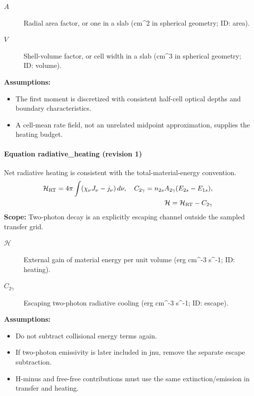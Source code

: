 \begin{description}
\item[$A$] Radial area factor, or one in a slab (cm\textasciicircum{}2 in spherical geometry; ID: area).
\item[$V$] Shell-volume factor, or cell width in a slab (cm\textasciicircum{}3 in spherical geometry; ID: volume).
\end{description}

\noindent\textbf{Assumptions:}
\begin{itemize}
\item The first moment is discretized with consistent half-cell optical depths and boundary characteristics.
\item A cell-mean rate field, not an unrelated midpoint approximation, supplies the heating budget.
\end{itemize}

\paragraph{Equation radiative\_heating (revision 1)}
Net radiative heating is consistent with the total-material-energy convention.
\begin{equation}
\begin{aligned}
\mathcal H_{\rm RT}=4\pi\int(\chi_\nu J_\nu-j_\nu)\,d\nu,\quad C_{2\gamma}=n_{2s}A_{2\gamma}(E_{2s}-E_{1s}),\\\mathcal H=\mathcal H_{\rm RT}-C_{2\gamma}
\end{aligned}
\label{eq:escape.coupled_5f_hydrogen:radiative_5f_heating:1}
\end{equation}
\noindent\textbf{Scope:} Two-photon decay is an explicitly escaping channel outside the sampled transfer grid.

\begin{description}
\item[$\mathcal H$] External gain of material energy per unit volume (erg cm\textasciicircum{}-3 s\textasciicircum{}-1; ID: heating).
\item[$C_{2\gamma}$] Escaping two-photon radiative cooling (erg cm\textasciicircum{}-3 s\textasciicircum{}-1; ID: escape).
\end{description}

\noindent\textbf{Assumptions:}
\begin{itemize}
\item Do not subtract collisional energy terms again.
\item If two-photon emissivity is later included in jnu, remove the separate escape subtraction.
\item H-minus and free-free contributions must use the same extinction/emission in transfer and heating.
\end{itemize}


